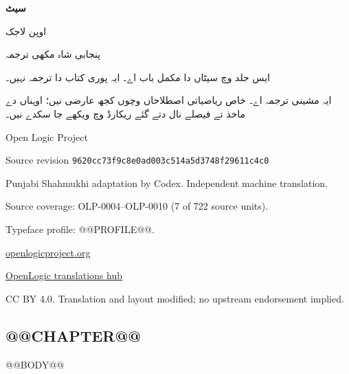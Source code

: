 \documentclass[12pt,a4paper,oneside,openany]{book}
\begin{document}
\begin{titlepage}
\begin{Arabic}
\centering
\vspace*{18mm}
{\Huge\bfseries سیٹ\par}
\vspace{8mm}
{\LARGE اوپن لاجک\par}
\vspace{5mm}
{\Large پنجابی شاہ مکھی ترجمہ\par}
\vspace{16mm}
ایس جلد وچ سیٹاں دا مکمل باب اے۔ ایہ پوری کتاب دا ترجمہ نہیں۔
\par
ایہ مشینی ترجمہ اے۔ خاص ریاضیاتی اصطلاحاں وچوں کجھ عارضی نیں؛
اوہناں دے ماخذ تے فیصلے نال دتے گئے ریکارڈ وچ ویکھے جا سکدے نیں۔
\vfill
\end{Arabic}
\begin{center}
Open Logic Project\par
Source revision \texttt{9620cc73f9c8e0ad003c514a5d3748f29611c4c0}\par
Punjabi Shahmukhi adaptation by Codex. Independent machine translation.\par
Source coverage: OLP-0004--OLP-0010 (7 of 722 source units).\par
Typeface profile: @@PROFILE@@.\par
\href{https://openlogicproject.org/}{openlogicproject.org}\par
\href{https://github.com/KokunoYumeto/OpenLogic-translations}{OpenLogic translations hub}\par
CC BY 4.0. Translation and layout modified; no upstream endorsement implied.
\end{center}
\end{titlepage}
\mainmatter
\begin{Arabic}
\chapter{@@CHAPTER@@}\label{sfr:set::chap}
@@BODY@@
\end{Arabic}
\end{document}
